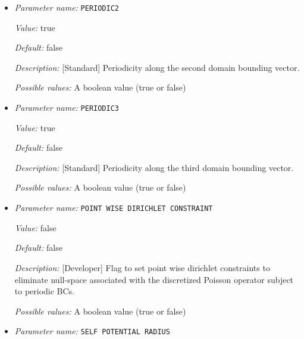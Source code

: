 \begin{itemize}
{\it Default:} false


{\it Description:} [Standard] Periodicity along the first domain bounding vector.


{\it Possible values:} A boolean value (true or false)
\item {\it Parameter name:} {\tt PERIODIC2}
\label{parameters:Boundary conditions/PERIODIC2}
\label{parameters:Boundary_20conditions/PERIODIC2}


{\it Value:} true


{\it Default:} false


{\it Description:} [Standard] Periodicity along the second domain bounding vector.


{\it Possible values:} A boolean value (true or false)
\item {\it Parameter name:} {\tt PERIODIC3}
\label{parameters:Boundary conditions/PERIODIC3}
\label{parameters:Boundary_20conditions/PERIODIC3}


{\it Value:} true


{\it Default:} false


{\it Description:} [Standard] Periodicity along the third domain bounding vector.


{\it Possible values:} A boolean value (true or false)
\item {\it Parameter name:} {\tt POINT WISE DIRICHLET CONSTRAINT}
\label{parameters:Boundary conditions/POINT WISE DIRICHLET CONSTRAINT}
\label{parameters:Boundary_20conditions/POINT_20WISE_20DIRICHLET_20CONSTRAINT}


{\it Value:} false


{\it Default:} false


{\it Description:} [Developer] Flag to set point wise dirichlet constraints to eliminate null-space associated with the discretized Poisson operator subject to periodic BCs.


{\it Possible values:} A boolean value (true or false)
\item {\it Parameter name:} {\tt SELF POTENTIAL RADIUS}
\label{parameters:Boundary conditions/SELF POTENTIAL RADIUS}
\label{parameters:Boundary_20conditions/SELF_20POTENTIAL_20RADIUS}



\end{itemize}
